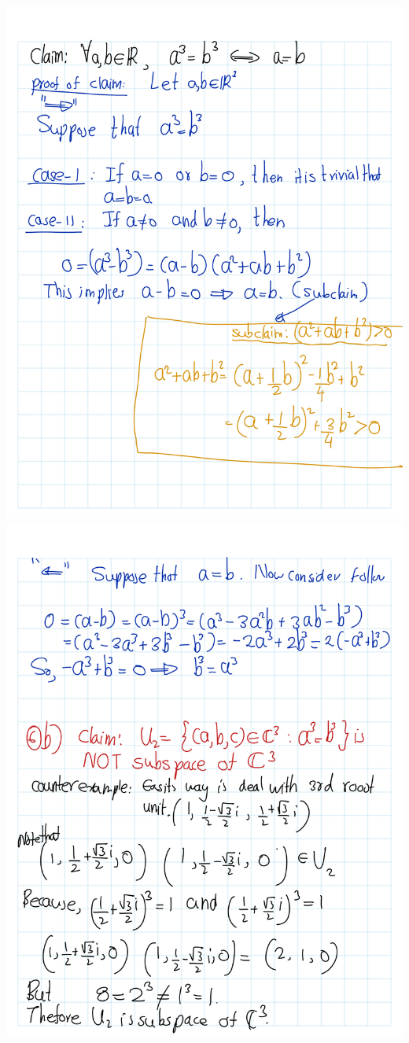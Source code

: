 \documentclass[
]{book}
\theoremstyle{definition}
\theoremstyle{definition}
\theoremstyle{definition}
\theoremstyle{definition}
\theoremstyle{remark}
\begin{document}
\begin{enumerate}
  \includegraphics{fig/Ex1C/Ex/Ex-02.png}
  \includegraphics{fig/Ex1C/Ex/Ex-03.png}

\end{enumerate}
\end{document}

